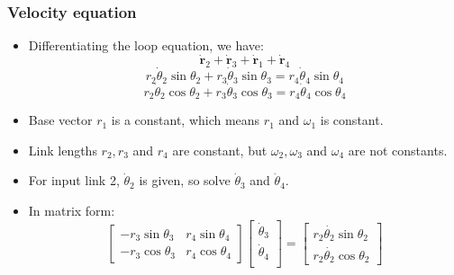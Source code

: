 \documentclass[11pt]{article}
\begin{document}
\subsubsection{Velocity equation}
\label{sec:orgc140ba1}
\begin{itemize}
\item Differentiating the loop equation, we have:
\[\dot{\boldsymbol{r}}_2 + \dot{\boldsymbol{r}}_3 + \dot{\boldsymbol{r}}_1 + \dot{\boldsymbol{r}}_4\]
\[r_2 \dot{\theta}_2 \sin \theta_2 + r_3 \dot{\theta}_3 \sin \theta_3 = r_4 \dot{\theta}_4 \sin \theta_4\]
\[r_2 \dot{\theta}_2 \cos \theta_2 + r_3 \dot{\theta}_3 \cos \theta_3 = r_4 \dot{\theta}_4 \cos \theta_4\]
\item Base vector \(r_1\) is a constant, which means \(r_1\) and \(\omega_1\) is constant.
\item Link lengths \(r_2, r_3\) and \(r_4\) are constant, but \(\omega_2, \omega_3\) and \(\omega_4\) are not constants.
\item For input link 2, \(\dot{\theta}_2\) is given, so solve \(\dot{\theta}_3\) and \(\dot{\theta}_4\).
\item In matrix form:
\begin{displaymath}
\begin{bmatrix}
-r_3 \sin \theta_3 & r_4 \sin \theta_4 \\
-r_3 \cos \theta_3 & r_4 \cos \theta_4
\end{bmatrix}
\begin{bmatrix}
\dot{\theta}_3 \\
\dot{\theta}_4 \\
\end{bmatrix} = \begin{bmatrix}
r_2 \dot{\theta_2} \sin \theta_2 \\
r_2 \dot{\theta_2} \cos \theta_2
\end{bmatrix}
\end{displaymath}
\end{itemize}
\end{document}
